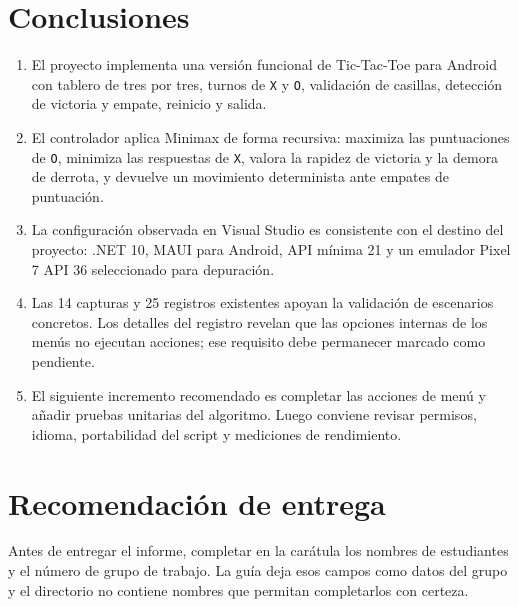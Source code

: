 \section{Conclusiones}
\begin{enumerate}
  \item El proyecto implementa una versión funcional de Tic-Tac-Toe para Android con tablero de tres por tres, turnos de \texttt{X} y \texttt{O}, validación de casillas, detección de victoria y empate, reinicio y salida.
  \item El controlador aplica Minimax de forma recursiva: maximiza las puntuaciones de \texttt{O}, minimiza las respuestas de \texttt{X}, valora la rapidez de victoria y la demora de derrota, y devuelve un movimiento determinista ante empates de puntuación.
  \item La configuración observada en Visual Studio es consistente con el destino del proyecto: .NET 10, MAUI para Android, API mínima 21 y un emulador Pixel 7 API 36 seleccionado para depuración.
  \item Las 14 capturas y 25 registros existentes apoyan la validación de escenarios concretos. Los detalles del registro revelan que las opciones internas de los menús no ejecutan acciones; ese requisito debe permanecer marcado como pendiente.
  \item El siguiente incremento recomendado es completar las acciones de menú y añadir pruebas unitarias del algoritmo. Luego conviene revisar permisos, idioma, portabilidad del script y mediciones de rendimiento.
\end{enumerate}

\section{Recomendación de entrega}
Antes de entregar el informe, completar en la carátula los nombres de estudiantes y el número de grupo de trabajo. La guía deja esos campos como datos del grupo y el directorio no contiene nombres que permitan completarlos con certeza.

